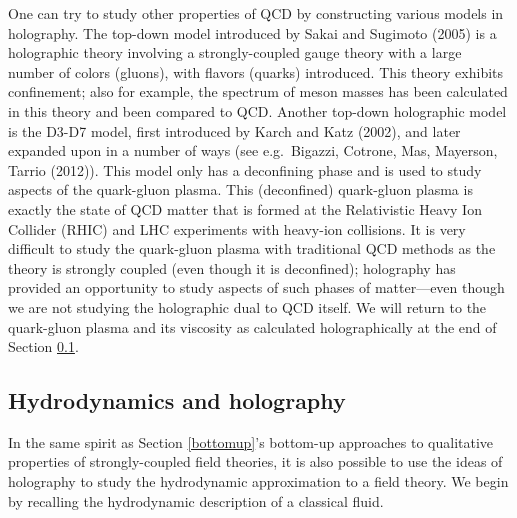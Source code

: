 \documentclass[12pt]{article}
\renewcommand{\^}[1]{\hat{#1}}
\begin{document}

One can try to study other properties of QCD by constructing various models in holography. The top-down model introduced by Sakai and Sugimoto (2005) is a holographic theory involving a strongly-coupled gauge theory with a large number of colors (gluons), with flavors (quarks) introduced. This theory exhibits confinement; also for example, the spectrum of meson masses has been calculated in this theory and been compared to QCD. Another top-down holographic model is the D3-D7 model, first introduced by Karch and Katz (2002), and later expanded upon in a number of ways (see e.g.~Bigazzi, Cotrone, Mas, Mayerson, Tarrio (2012)). This model only has a deconfining phase and is used to study aspects of the quark-gluon plasma. This (deconfined) quark-gluon plasma is exactly the state of QCD matter that is formed at the  Relativistic Heavy Ion Collider (RHIC) and LHC experiments with heavy-ion collisions. It is very difficult to study the quark-gluon plasma with traditional QCD methods as the theory is strongly coupled (even though it is deconfined); holography has provided an opportunity to study aspects of such phases of matter---even though we are not studying the holographic dual to QCD itself. We will return to the quark-gluon plasma and its viscosity as calculated holographically at the end of Section \ref{hydro}.


\subsection{Hydrodynamics and holography}\label{hydro}

In the same spirit as Section \ref{bottomup}'s bottom-up approaches to qualitative properties of strongly-coupled field theories, it is also possible to use the ideas of holography to study the hydrodynamic approximation to a field theory. We begin by recalling the hydrodynamic description of a classical
fluid.
\end{document}
